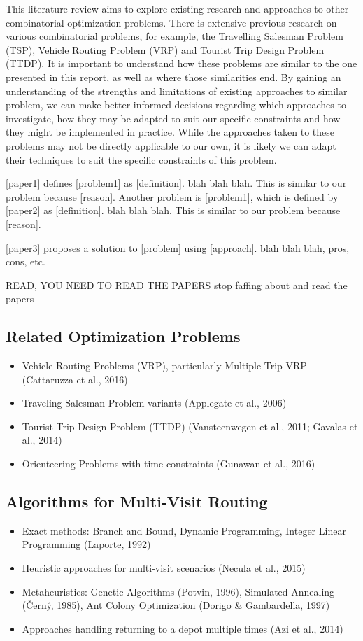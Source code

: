 This literature review aims to explore existing research and approaches to other combinatorial optimization problems.
There is extensive previous research on various combinatorial problems, for example, the Travelling Salesman
Problem (TSP), Vehicle Routing Problem (VRP) and Tourist Trip Design Problem (TTDP).
It is important to understand how these problems are similar to the one presented in this report, as well as where
those similarities end.
By gaining an understanding of the strengths and limitations of existing approaches to similar problem, we can make
better informed decisions regarding which approaches to investigate, how they may be adapted to suit our specific
constraints and how they might be implemented in practice.
While the approaches taken to these problems may not be directly applicable to our own, it is likely we can adapt their
techniques to suit the specific constraints of this problem.

[paper1] defines [problem1] as [definition].
blah blah blah.
This is similar to our problem because [reason].
Another problem is [problem1], which is defined by [paper2] as [definition].
blah blah blah.
This is similar to our problem because [reason].

[paper3] proposes a solution to [problem] using [approach].
blah blah blah, pros, cons, etc.

READ, YOU NEED TO READ THE PAPERS stop faffing about and read the papers


\subsection{Related Optimization Problems}
\begin{itemize}
    \item Vehicle Routing Problems (VRP), particularly Multiple-Trip VRP (Cattaruzza et al., 2016)
    \item Traveling Salesman Problem variants (Applegate et al., 2006)
    \item Tourist Trip Design Problem (TTDP) (Vansteenwegen et al., 2011; Gavalas et al., 2014)
    \item Orienteering Problems with time constraints (Gunawan et al., 2016)
\end{itemize}

\subsection{Algorithms for Multi-Visit Routing}
\begin{itemize}
    \item Exact methods: Branch and Bound, Dynamic Programming, Integer Linear Programming (Laporte, 1992)
    \item Heuristic approaches for multi-visit scenarios (Necula et al., 2015)
    \item Metaheuristics: Genetic Algorithms (Potvin, 1996), Simulated Annealing (Černý, 1985), Ant Colony Optimization (Dorigo \& Gambardella, 1997)
    \item Approaches handling returning to a depot multiple times (Azi et al., 2014)
\end{itemize}


